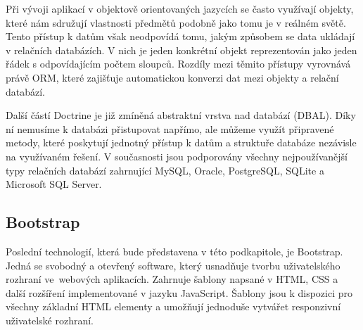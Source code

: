 Při vývoji aplikací v objektově orientovaných jazycích se často využívají objekty, které nám sdružují vlastnosti předmětů podobně jako tomu je v reálném světě. Tento přístup k datům však neodpovídá tomu, jakým způsobem se data ukládají v relačních databázích. V nich je jeden konkrétní objekt reprezentován jako jeden řádek s odpovídajícím počtem sloupců. Rozdíly mezi těmito přístupy vyrovnává právě ORM, které zajišťuje automatickou konverzi dat mezi objekty a relační databází. \cite{doctrine_orm}

Další částí Doctrine je již zmíněná abstraktní vrstva nad databází (DBAL). Díky ní nemusíme k databázi přistupovat napřímo, ale můžeme využít připravené metody, které poskytují jednotný přístup k datům a struktuře databáze nezávisle na využívaném řešení. V současnosti jsou podporovány všechny nejpoužívanější typy relačních databází zahrnující MySQL, Oracle, PostgreSQL, SQLite a Microsoft SQL Server. \cite{doctrine_dbal}

\subsection{Bootstrap}\label{bootstrap}
Poslední technologií, která bude představena v této podkapitole, je Bootstrap. Jedná se svobodný a otevřený software, který usnadňuje tvorbu uživatelského rozhraní ve~webových aplikacích. Zahrnuje šablony napsané v HTML, CSS a další rozšíření implementované v jazyku JavaScript. Šablony jsou k dispozici pro všechny základní HTML elementy a umožňují jednoduše vytvářet responzivní uživatelské rozhraní. \cite{bootstrap}
